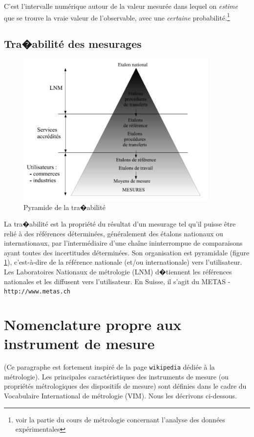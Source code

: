 C'est l'intervalle numérique autour de la valeur mesurée dans lequel on \textit{estime} que se trouve la vraie valeur de l'observable, avec une \textit{certaine} probabilité.\footnote{voir la partie du cours de métrologie concernant l'analyse des données expérimentales}

\subsection{Tra�abilité des mesurages}

\begin{figure}
   \centering
   \vspace{-5mm}
   \includegraphics[width=10cm]{assets/figures/pyramideTracabilite.pdf}
   \caption{Pyramide de la tra�abilité}
   \label{fig:pyr}
\end{figure}
La tra�abilité est la propriété du résultat d'un mesurage tel qu'il puisse être relié à des références déterminées, généralement des étalons nationaux ou internationaux, par l'intermédiaire d'une chaîne ininterrompue de comparaisons ayant toutes des incertitudes déterminées. Son organisation est pyramidale (figure \ref{fig:pyr}), c'est-à-dire de la référence nationale (et/ou internationale) vers l'utilisateur. Les Laboratoires Nationaux de métrologie (LNM) d�tiennent les références nationales et les diffusent vers l'utilisateur. En Suisse, il s'agit du METAS - \texttt{http://www.metas.ch}

\section{Nomenclature propre aux instrument de mesure}

(Ce paragraphe est fortement inspiré de la page \texttt{wikipedia} dédiée à la métrologie). Les principales caractéristiques des instruments de mesure (ou propriétés métrologiques des dispositifs de mesure) sont définies dans le cadre du Vocabulaire International de métrologie (VIM). Nous les décrivons ci-dessous.

